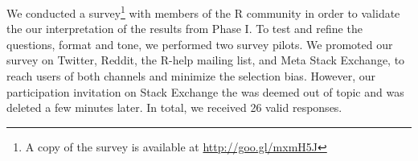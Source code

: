 We conducted a survey\footnote{A copy of the survey is available at \url{http://goo.gl/mxmH5J}} with members of the R community in order to validate the our interpretation of the results from Phase I. %
To test and refine the questions, format and tone, we performed two survey pilots. 
We promoted our survey on Twitter, Reddit, the R-help mailing list, and Meta Stack Exchange, to reach users of both channels and minimize the selection bias. However, our participation invitation on Stack Exchange the was deemed out of topic and was deleted a few minutes later. In total, we received 26 valid responses.

